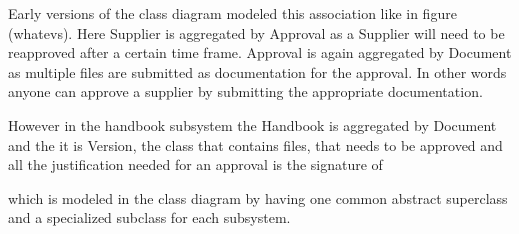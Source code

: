 Early versions of the class diagram modeled this association like in figure {\color{red}(whatevs)}. Here Supplier is aggregated by Approval as a Supplier will need to be reapproved after a certain time frame. Approval is again aggregated by Document as multiple files are submitted as documentation for the approval. In other words anyone can approve a supplier by submitting the appropriate documentation.

However in the handbook subsystem the Handbook is aggregated by Document and the
it is Version, the class that contains files, that needs to be approved and all the justification needed for an approval is the signature of



 which is modeled in the class diagram by having one common abstract superclass and a specialized subclass for each subsystem.
